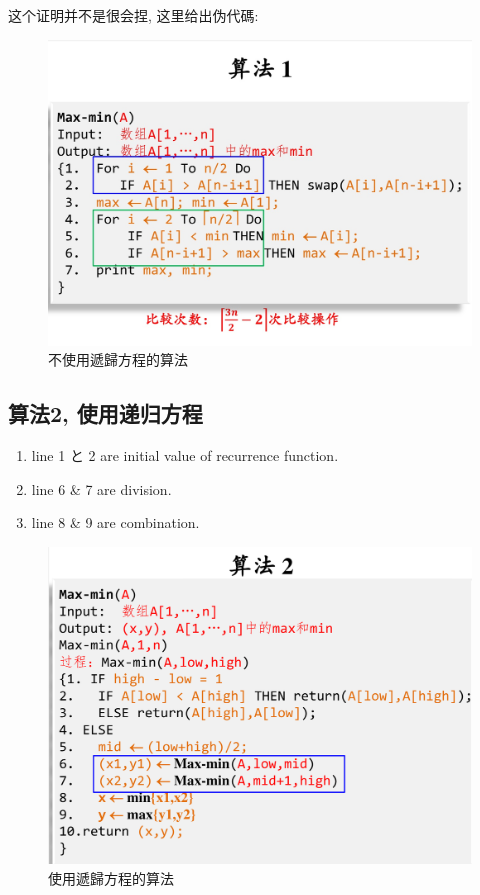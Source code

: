 \documentclass[a4paper, 10pt]{ctexart} %
\begin{document}
\newpage
这个证明并不是很会捏, 这里给出伪代碼:
\begin{figure}[H]
    \centering
    \includegraphics[scale=0.3]{1.jpg}\caption{不使用遞歸方程的算法}
\end{figure}
\subsection{算法2, 使用递归方程}
\begin{enumerate}
    \item line 1 と 2 are initial value of recurrence function. 
    \item line 6 \& 7 are division. 
    \item line 8 \& 9 are combination.
\end{enumerate}
\begin{figure}[H]
    \centering
    \includegraphics*[scale = 0.3]{2.png}\caption{使用遞歸方程的算法}
\end{figure}
\end{document}
